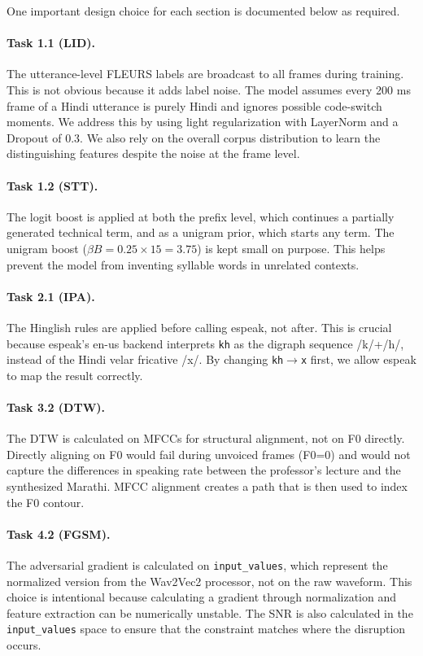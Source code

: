 \documentclass[10pt,twocolumn,letterpaper]{article}
\begin{document}
One important design choice for each section is documented below as required.

\paragraph{Task 1.1 (LID).} The utterance-level FLEURS labels are broadcast to all frames during training. This is not obvious because it adds label noise. The model assumes every 200 ms frame of a Hindi utterance is purely Hindi and ignores possible code-switch moments. We address this by using light regularization with LayerNorm and a Dropout of 0.3. We also rely on the overall corpus distribution to learn the distinguishing features despite the noise at the frame level.

\paragraph{Task 1.2 (STT).} The logit boost is applied at both the prefix level, which continues a partially generated technical term, and as a unigram prior, which starts any term. The unigram boost ($\beta B = 0.25 \times 15 = 3.75$) is kept small on purpose. This helps prevent the model from inventing syllable words in unrelated contexts.

\paragraph{Task 2.1 (IPA).} The Hinglish rules are applied before calling espeak, not after. This is crucial because espeak's en-us backend interprets \texttt{kh} as the digraph sequence /k/+/h/, instead of the Hindi velar fricative /x/. By changing \texttt{kh}$\to$\texttt{x} first, we allow espeak to map the result correctly.

\paragraph{Task 3.2 (DTW).} The DTW is calculated on MFCCs for structural alignment, not on F0 directly. Directly aligning on F0 would fail during unvoiced frames (F0=0) and would not capture the differences in speaking rate between the professor's lecture and the synthesized Marathi. MFCC alignment creates a path that is then used to index the F0 contour.

\paragraph{Task 4.2 (FGSM).} The adversarial gradient is calculated on \texttt{input\_values}, which represent the normalized version from the Wav2Vec2 processor, not on the raw waveform. This choice is intentional because calculating a gradient through normalization and feature extraction can be numerically unstable. The SNR is also calculated in the \texttt{input\_values} space to ensure that the constraint matches where the disruption occurs.
\end{document}
